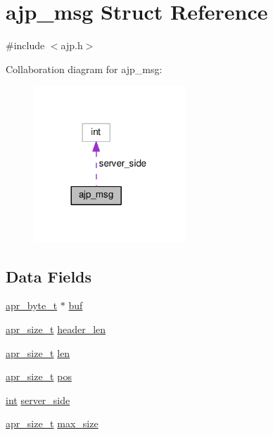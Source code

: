 \hypertarget{structajp__msg}{}\section{ajp\+\_\+msg Struct Reference}
\label{structajp__msg}


{\ttfamily \#include $<$ajp.\+h$>$}



Collaboration diagram for ajp\+\_\+msg\+:
\nopagebreak
\begin{figure}[H]
\begin{center}
\leavevmode
\includegraphics[width=161pt]{structajp__msg__coll__graph}
\end{center}
\end{figure}
\subsection*{Data Fields}
\begin{DoxyCompactItemize}
\item 
\hyperlink{group__apr__platform_gadcfa334915b4605a0052cb4ca542eb3a}{apr\+\_\+byte\+\_\+t} $\ast$ \hyperlink{structajp__msg_a7343b1803e9177dccb3c4716a5e12c3a}{buf}
\item 
\hyperlink{group__apr__platform_gaaa72b2253f6f3032cefea5712a27540e}{apr\+\_\+size\+\_\+t} \hyperlink{structajp__msg_a602e2c87aa4d6c3cff86c447d5e320a4}{header\+\_\+len}
\item 
\hyperlink{group__apr__platform_gaaa72b2253f6f3032cefea5712a27540e}{apr\+\_\+size\+\_\+t} \hyperlink{structajp__msg_ab31fbddb808b5f3c0549cdb0f39639cf}{len}
\item 
\hyperlink{group__apr__platform_gaaa72b2253f6f3032cefea5712a27540e}{apr\+\_\+size\+\_\+t} \hyperlink{structajp__msg_af2b6552360c32f52f84383d538d3df00}{pos}
\item 
\hyperlink{pcre_8txt_a42dfa4ff673c82d8efe7144098fbc198}{int} \hyperlink{structajp__msg_ac7e410963f1d5bded8e7df9fe5605484}{server\+\_\+side}
\item 
\hyperlink{group__apr__platform_gaaa72b2253f6f3032cefea5712a27540e}{apr\+\_\+size\+\_\+t} \hyperlink{structajp__msg_a70f7c841e5b344fc94175a0ebcd7f062}{max\+\_\+size}
\end{DoxyCompactItemize}


